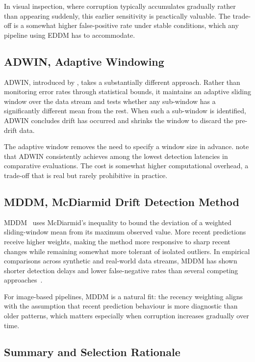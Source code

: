 In visual inspection, where corruption typically accumulates gradually rather than appearing suddenly, this earlier sensitivity is practically valuable. The trade-off is a somewhat higher false-positive rate under stable conditions, which any pipeline using EDDM has to accommodate.

\subsection{ADWIN, Adaptive Windowing}

ADWIN, introduced by \textcite{Bifet2007}, takes a substantially different approach. Rather than monitoring error rates through statistical bounds, it maintains an adaptive sliding window over the data stream and tests whether any sub-window has a significantly different mean from the rest. When such a sub-window is identified, ADWIN concludes drift has occurred and shrinks the window to discard the pre-drift data.

The adaptive window removes the need to specify a window size in advance. \textcite{Bayram2022} note that ADWIN consistently achieves among the lowest detection latencies in comparative evaluations. The cost is somewhat higher computational overhead, a trade-off that is real but rarely prohibitive in practice.

\subsection{MDDM, McDiarmid Drift Detection Method}

MDDM~\autocite{Pesaranghader2017} uses McDiarmid's inequality to bound the deviation of a weighted sliding-window mean from its maximum observed value. More recent predictions receive higher weights, making the method more responsive to sharp recent changes while remaining somewhat more tolerant of isolated outliers. In empirical comparisons across synthetic and real-world data streams, MDDM has shown shorter detection delays and lower false-negative rates than several competing approaches~\autocite{Pesaranghader2017}.

For image-based pipelines, MDDM is a natural fit: the recency weighting aligns with the assumption that recent prediction behaviour is more diagnostic than older patterns, which matters especially when corruption increases gradually over time.

\subsection{Summary and Selection Rationale}

